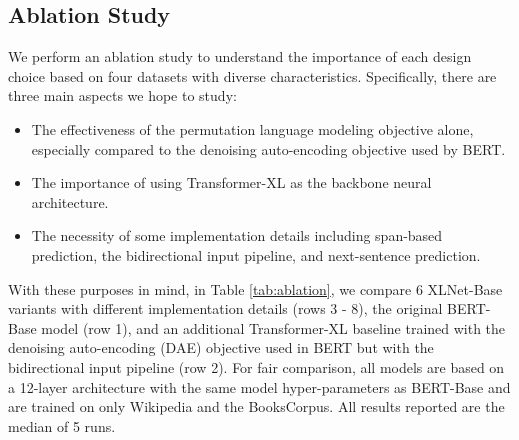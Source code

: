 \subsection{Ablation Study}
\label{sec:ablation}
 
We perform an ablation study to understand the importance of each design choice based on four datasets with diverse characteristics.
Specifically, there are three main aspects we hope to study:
\begin{itemize}[leftmargin=*,itemsep=0em,topsep=0em]
\item The effectiveness of the permutation language modeling objective alone, especially compared to the denoising auto-encoding objective used by BERT.
\item The importance of using Transformer-XL as the backbone neural architecture. 
\item The necessity of some implementation details including span-based prediction, the bidirectional input pipeline, and next-sentence prediction.
\end{itemize}
With these purposes in mind, in Table \ref{tab:ablation}, we compare 6 XLNet-Base variants with different implementation details (rows 3 - 8), the original BERT-Base model (row 1), and an additional Transformer-XL baseline trained with the denoising auto-encoding (DAE) objective used in BERT but with the bidirectional input pipeline (row 2).
For fair comparison, all models are based on a 12-layer architecture with the same model hyper-parameters as BERT-Base and are trained on only Wikipedia and the BooksCorpus.
All results reported are the median of 5 runs.

